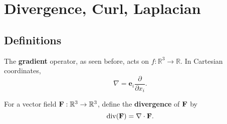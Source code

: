 \section{Divergence, Curl, Laplacian}
\subsection{Definitions}
\begin{definition}[Gradient]
    The \textbf{gradient} operator, as seen before, acts on $ f:\mathbb{R}^{3}\to \mathbb{R}  $. In Cartesian coordinates,
    \[
        \nabla  = \mathbf{e}_i \frac{\partial }{\partial x_i}. 
    \]
\end{definition}
\begin{definition}[Divergence]
    For a vector field $ {\bf F}: \mathbb{R}^{3}\to \mathbb{R}^{3} $, define the \textbf{divergence} of ${\bf F}$ by 
    \[
        \operatorname{div} ({\bf F}) = \nabla\cdot {\bf F}.
    \]
\end{definition}

